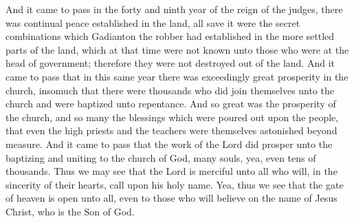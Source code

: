 \bverse \iffalse And it came to pass in the forty and ninth year of the reign of the judges, there was continual peace established in the land, all save it were the secret combinations which Gadianton the robber had established in the more settled parts of the land, which at that time were not known unto those who were at the head of government; therefore they were not destroyed out of the land. \fi
And it came to pass in the forty and ninth year of the reign of the judges, there was continual peace established in the land, all save it were the secret combinations which Gadianton the robber had established in the more settled parts of the land, which at that time were not known unto those who were at the head of government; therefore they were not destroyed out of the land.
\bverse \iffalse And it came to pass that in this same year there was exceedingly great prosperity in the church, insomuch that there were thousands who did join themselves unto the church and were baptized unto repentance. \fi
And it came to pass that in this same year there was exceedingly great prosperity in the church, insomuch that there were thousands who did join themselves unto the church and were baptized unto repentance.
\bverse \iffalse And so great was the prosperity of the church, and so many the blessings which were poured out upon the people, that even the high priests and the teachers were themselves astonished beyond measure. \fi
And so great was the prosperity of the church, and so many the blessings which were poured out upon the people, that even the high priests and the teachers were themselves astonished beyond measure.
\bverse \iffalse And it came to pass that the work of the Lord did prosper unto the baptizing and uniting to the church of God, many souls, yea, even tens of thousands. \fi
And it came to pass that the work of the Lord did prosper unto the baptizing and uniting to the church of God, many souls, yea, even tens of thousands.
\bverse \iffalse Thus we may see that the Lord is merciful unto all who will, in the sincerity of their hearts, call upon his holy name. \fi
Thus we may see that the Lord is merciful unto all who will, in the sincerity of their hearts, call upon his holy name.
\bverse \iffalse Yea, thus we see that the gate of heaven is open unto all, even to those who will believe on the name of Jesus Christ, who is the Son of God. \fi
Yea, thus we see that the gate of heaven is open unto all, even to those who will believe on the name of Jesus Christ, who is the Son of God.
